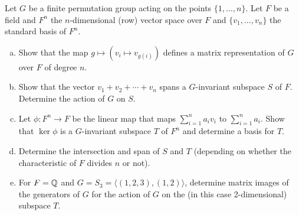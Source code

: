 \documentclass[leqno]{article}
\begin{document}
\newpage
\begin{problem}
Let $G$ be a finite permutation group acting on the points $\{1,\dots,n\}$. Let $F$ be a field and $F^n$ the $n$-dimensional (row) vector space over $F$ and $\{v_1,\dots,v_n\}$ the standard basis of $F^n$. 
\begin{enumerate}[(a)]
    \item Show that the map $g\mapsto (v_i\mapsto v_{g(i)})$ defines a matrix representation of $G$ over $F$ of degree $n$.
    \item Show that the vector $v_1+v_2+\cdots+v_n$ spans a $G$-invariant subspace $S$ of $F$. Determine the action of $G$ on $S$.
    \item Let $\phi \colon F^n \to F$ be the linear map that maps $\sum_{i=1}^n a_i v_i$ to $\sum_{i=1}^n a_i$. Show that $\ker \phi$ is a $G$-invariant subspace $T$ of $F^n$ and determine a basis for $T$. 
    \item Determine the intersection and span of $S$ and $T$ (depending on whether the characteristic of $F$ divides $n$ or not).
    \item For $F=\mathbb{Q}$ and $G=S_3=\langle (1,2,3),(1,2)\rangle$, determine matrix images of the generators of $G$ for the action of $G$ on the (in this case 2-dimensional) subspace $T$.
\end{enumerate}
\end{problem}
\end{document}
